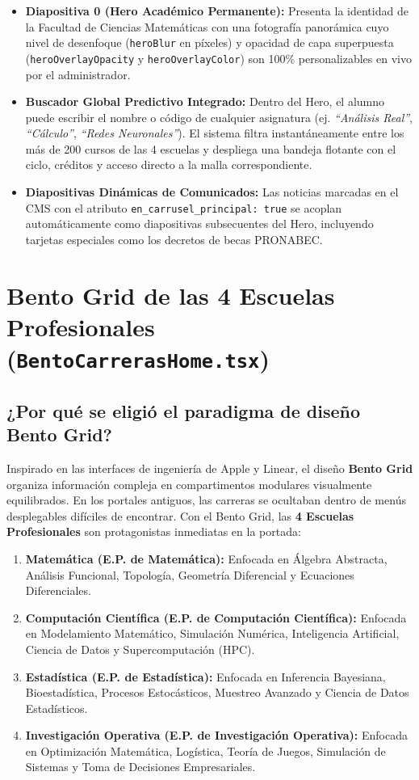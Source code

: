 \documentclass[12pt,a4paper,oneside]{report}
\begin{document}
\begin{itemize}[leftmargin=1.0cm]
  \item \textbf{Diapositiva 0 (Hero Académico Permanente):} Presenta la identidad de la Facultad de Ciencias Matemáticas con una fotografía panorámica cuyo nivel de desenfoque (\texttt{heroBlur} en píxeles) y opacidad de capa superpuesta (\texttt{heroOverlayOpacity} y \texttt{heroOverlayColor}) son 100\% personalizables en vivo por el administrador.
  \item \textbf{Buscador Global Predictivo Integrado:} Dentro del Hero, el alumno puede escribir el nombre o código de cualquier asignatura (ej. \textit{``Análisis Real''}, \textit{``Cálculo''}, \textit{``Redes Neuronales''}). El sistema filtra instantáneamente entre los más de 200 cursos de las 4 escuelas y despliega una bandeja flotante con el ciclo, créditos y acceso directo a la malla correspondiente.
  \item \textbf{Diapositivas Dinámicas de Comunicados:} Las noticias marcadas en el CMS con el atributo \texttt{en\_carrusel\_principal: true} se acoplan automáticamente como diapositivas subsecuentes del Hero, incluyendo tarjetas especiales como los decretos de becas PRONABEC.
\end{itemize}

\section{Bento Grid de las 4 Escuelas Profesionales (\texttt{BentoCarrerasHome.tsx})}
\subsection{¿Por qué se eligió el paradigma de diseño Bento Grid?}
Inspirado en las interfaces de ingeniería de Apple y Linear, el diseño \textbf{Bento Grid} organiza información compleja en compartimentos modulares visualmente equilibrados. En los portales antiguos, las carreras se ocultaban dentro de menús desplegables difíciles de encontrar. Con el Bento Grid, las \textbf{4 Escuelas Profesionales} son protagonistas inmediatas en la portada:

\begin{enumerate}[label=\textbf{Escuela \arabic*:}, leftmargin=1.9cm]
  \item \textbf{Matemática (E.P. de Matemática):} Enfocada en Álgebra Abstracta, Análisis Funcional, Topología, Geometría Diferencial y Ecuaciones Diferenciales.
  \item \textbf{Computación Científica (E.P. de Computación Científica):} Enfocada en Modelamiento Matemático, Simulación Numérica, Inteligencia Artificial, Ciencia de Datos y Supercomputación (HPC).
  \item \textbf{Estadística (E.P. de Estadística):} Enfocada en Inferencia Bayesiana, Bioestadística, Procesos Estocásticos, Muestreo Avanzado y Ciencia de Datos Estadísticos.
  \item \textbf{Investigación Operativa (E.P. de Investigación Operativa):} Enfocada en Optimización Matemática, Logística, Teoría de Juegos, Simulación de Sistemas y Toma de Decisiones Empresariales.
\end{enumerate}
\end{document}

